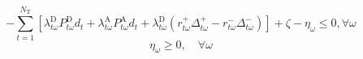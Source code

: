 \begin{equation*}
-\sum_{t=1}^{N_{\mathrm{T}}}\left[\lambda_{t \omega}^{\mathrm{D}} P_{t \omega}^{\mathrm{D}} d_{t}+\lambda_{t \omega}^{\mathrm{A}} P_{t \omega}^{\mathrm{A}} d_{t}+\lambda_{t \omega}^{\mathrm{D}}\left(r_{t \omega}^{+} \Delta_{t \omega}^{+}-r_{t \omega}^{-} \Delta_{t \omega}^{-}\right)\right]+\zeta-\eta_{\omega} \leq 0, \forall \omega
\end{equation*}
\begin{equation*}
\eta_{\omega} \geq 0, \quad \forall \omega
\end{equation*}